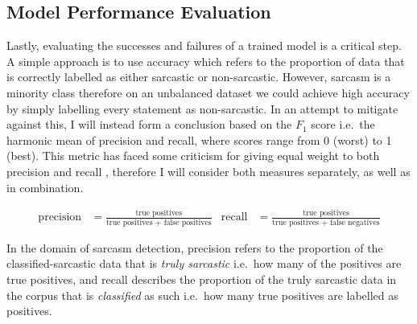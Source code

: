 \documentclass[12pt,a4paper]{article}
\begin{document}
\subsection{Model Performance Evaluation}
\noindent Lastly, evaluating the successes and failures of a trained model is a critical step. A simple approach is to use accuracy which refers to the proportion of data that is correctly labelled as either sarcastic or non-sarcastic. However, sarcasm is a minority class therefore on an unbalanced dataset we could achieve high accuracy by simply labelling every statement as non-sarcastic. In an attempt to mitigate against this, I will instead form a conclusion based on the $F_{1}$ score i.e.\ the harmonic mean of precision and recall, where scores range from 0 (worst) to 1 (best). This metric has faced some criticism for giving equal weight to both precision and recall \cite{hand2018note}, therefore I will consider both measures separately, as well as in combination.

\begin{align*}
\mbox{precision} &= \frac{\mbox{true positives}}{\mbox{true positives + false positives}}   &  \mbox{recall} &= \frac{\mbox{true positives}}{\mbox{true positives + false negatives}}
\end{align*}

\noindent In the domain of sarcasm detection, precision refers to the proportion of the classified-sarcastic data that is \textit{truly sarcastic} i.e.\ how many of the positives are true positives, and recall describes the proportion of the truly sarcastic data in the corpus that is \textit{classified} as such i.e.\ how many true positives are labelled as positives. \\

\hrulefill

\end{document}
